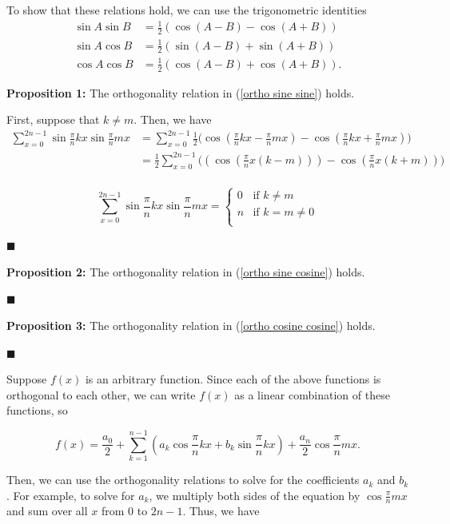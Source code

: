 \documentclass[11pt]{article}
\begin{document}
To show that these relations hold, we can use the trigonometric identities
\begin{align*}
    \sin A \sin B & = \frac{1}{2} \left( \cos(A-B) - \cos(A+B) \right) \\
    \sin A \cos B & = \frac{1}{2} \left( \sin(A-B) + \sin(A+B) \right) \\
    \cos A \cos B & = \frac{1}{2} \left( \cos(A-B) + \cos(A+B) \right).
\end{align*}

\textbf{Proposition 1:} The orthogonality relation in (\ref{ortho sine sine}) holds.

First, suppose that $k \neq m$. Then, we have
\begin{align*}
    \sum_{x=0}^{2n-1} \sin \frac{\pi}{n}kx \sin \frac{\pi}{n}mx & = \sum_{x=0}^{2n-1}\frac{1}{2}\biggl( \cos\left(\frac{\pi}{n}kx-\frac{\pi}{n}mx\right) - \cos\left(\frac{\pi}{n}kx+\frac{\pi}{n}mx\right)\biggr) \\
    & = \frac{1}{2}\sum_{x=0}^{2n-1}\biggl( \left( \cos\left(\frac{\pi}{n}x\left(k-m\right)\right)\right) - \cos\left(\frac{\pi}{n}x\left(k+m\right) \right)\biggr) \\
\end{align*}

\[\sum_{x=0}^{2n-1} \sin \frac{\pi}{n}kx \sin \frac{\pi}{n}mx = \begin{cases}
        0 & \text{if } k \neq m \\
        n & \text{if } k = m \neq 0 \\        
    \end{cases}\]


$\blacksquare$

\textbf{Proposition 2:} The orthogonality relation in (\ref{ortho sine cosine}) holds.

$\blacksquare$

\textbf{Proposition 3:} The orthogonality relation in (\ref{ortho cosine cosine}) holds.

$\blacksquare$

Suppose $f(x)$ is an arbitrary function. Since each of the above functions is orthogonal to each other, we can write $f(x)$ as a linear combination of these functions, so

\[f(x) = \frac{a_0}{2} + \sum_{k=1}^{n-1} \left( a_k \cos \frac{\pi}{n}kx + b_k \sin \frac{\pi}{n}kx \right) + \frac{a_n}{2} \cos \frac{\pi}{n}mx.\]

Then, we can use the orthogonality relations to solve for the coefficients $a_k$ and $b_k$. For example, to solve for $a_k$, we multiply both sides of the equation by $\cos \frac{\pi}{n}mx$ and sum over all $x$ from $0$ to $2n-1$. Thus, we have
\end{document}
